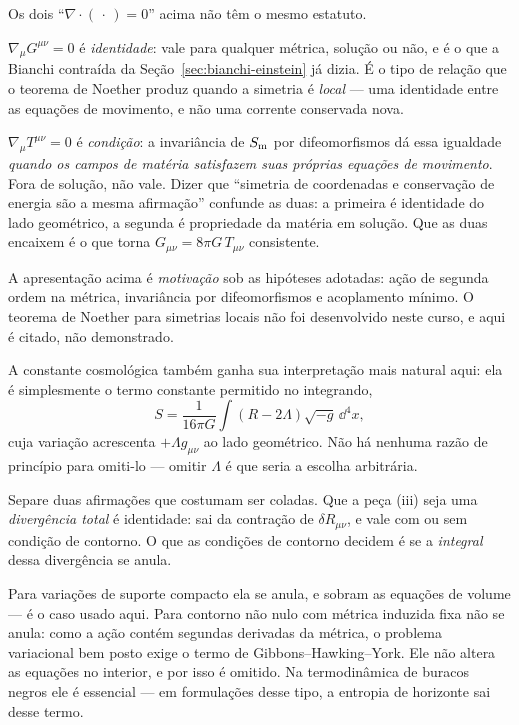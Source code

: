 \documentclass[12pt,a4paper,oneside]{book}
\theoremstyle{rgplain}
\theoremstyle{rgremark}
\begin{document}
\begin{atencao}
Os dois ``$\nabla\cdot(\,\cdot\,)=0$'' acima não têm o mesmo estatuto.

$\nabla_\mu G^{\mu\nu}=0$ é \emph{identidade}: vale para qualquer métrica,
solução ou não, e é o que a Bianchi contraída da
Seção~\ref{sec:bianchi-einstein} já dizia. É o tipo de relação que o teorema
de Noether produz quando a simetria é \emph{local} --- uma identidade entre as
equações de movimento, e não uma corrente conservada nova.

$\nabla_\mu T^{\mu\nu}=0$ é \emph{condição}: a invariância de $S_{\rm m}$ por
difeomorfismos dá essa igualdade \emph{quando os campos de matéria satisfazem
suas próprias equações de movimento}. Fora de solução, não vale. Dizer que
``simetria de coordenadas e conservação de energia são a mesma afirmação''
confunde as duas: a primeira é identidade do lado geométrico, a segunda é
propriedade da matéria em solução. Que as duas encaixem é o que torna
$G_{\mu\nu}=8\pi G\,T_{\mu\nu}$ consistente.

A apresentação acima é \emph{motivação} sob as hipóteses adotadas: ação de
segunda ordem na métrica, invariância por difeomorfismos e acoplamento
mínimo. O teorema de Noether para simetrias locais não foi desenvolvido neste
curso, e aqui é citado, não demonstrado.
\end{atencao}

A constante cosmológica também ganha sua interpretação mais natural aqui: ela
é simplesmente o termo constante permitido no integrando,
\[
  S=\frac{1}{16\pi G}\int (R-2\Lambda)\sqrt{-g}\,\dd^4x ,
\]
cuja variação acrescenta $+\Lambda g_{\mu\nu}$ ao lado geométrico. Não há
nenhuma razão de princípio para omiti-lo --- omitir $\Lambda$ é que seria a
escolha arbitrária.

\begin{atencao}
Separe duas afirmações que costumam ser coladas. Que a peça (iii) seja uma
\emph{divergência total} é identidade: sai da contração de $\delta
R_{\mu\nu}$, e vale com ou sem condição de contorno. O que as condições de
contorno decidem é se a \emph{integral} dessa divergência se anula.

Para variações de suporte compacto ela se anula, e sobram as equações de
volume --- é o caso usado aqui. Para contorno não nulo com métrica induzida
fixa não se anula: como a ação contém segundas derivadas da métrica, o
problema variacional bem posto exige o termo de Gibbons--Hawking--York. Ele
não altera as equações no interior, e por isso é omitido. Na termodinâmica de
buracos negros ele é essencial --- em formulações desse tipo, a entropia de
horizonte sai desse termo.
\end{atencao}
\end{document}
